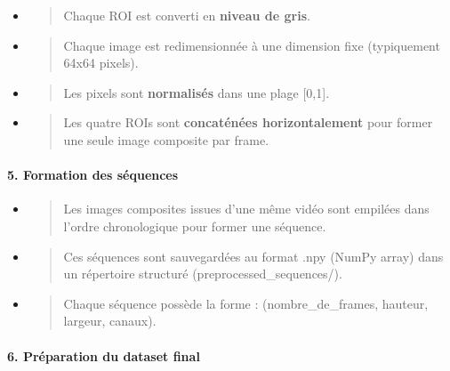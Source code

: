 \documentclass[
]{article}
\begin{document}
\begin{itemize}
\item
  \begin{quote}
  Chaque ROI est converti en \textbf{niveau de gris}.
  \end{quote}
\item
  \begin{quote}
  Chaque image est redimensionnée à une dimension fixe (typiquement 64x64 pixels).
  \end{quote}
\item
  \begin{quote}
  Les pixels sont \textbf{normalisés} dans une plage {[}0,1{]}.
  \end{quote}
\item
  \begin{quote}
  Les quatre ROIs sont \textbf{concaténées horizontalement} pour former une seule image composite par frame.
  \end{quote}
\end{itemize}

\hypertarget{formation-des-suxe9quences}{%
\paragraph{\texorpdfstring{\textbf{5. Formation des séquences}}{5. Formation des séquences}}\label{formation-des-suxe9quences}}

\begin{itemize}
\item
  \begin{quote}
  Les images composites issues d'une même vidéo sont empilées dans l'ordre chronologique pour former une séquence.
  \end{quote}
\item
  \begin{quote}
  Ces séquences sont sauvegardées au format .npy (NumPy array) dans un répertoire structuré (preprocessed\_sequences/).
  \end{quote}
\item
  \begin{quote}
  Chaque séquence possède la forme : (nombre\_de\_frames, hauteur, largeur, canaux).
  \end{quote}
\end{itemize}

\hypertarget{pruxe9paration-du-dataset-final}{%
\paragraph{\texorpdfstring{\textbf{6. Préparation du dataset final}}{6. Préparation du dataset final}}\label{pruxe9paration-du-dataset-final}}
\end{document}
